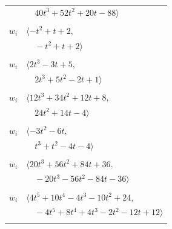 \documentclass[11pt]{article}
\begin{document}
\begin{longtable}{@{}ll@{}}
 & $\quad 40t^{3}+52t^{2}+20t-88\rangle$\\
\addlinespace[2pt]
\multicolumn{2}{@{}p{0.97\textwidth}@{}}{$i=26$, $D_i=1$, $\rho_{ij}$: $5{:}1, \allowbreak 10{:}2, \allowbreak 31{:}1$}\\
$w_i$ & $\langle -t^{2}+t+2,$\\
 & $\quad -t^{2}+t+2\rangle$\\
\addlinespace[2pt]
\multicolumn{2}{@{}p{0.97\textwidth}@{}}{$i=27$, $D_i=1$, $\rho_{ij}$: $1{:}2, \allowbreak 9{:}2, \allowbreak 10{:}1, \allowbreak 13{:}2, \allowbreak 34{:}2, \allowbreak 36{:}1$}\\
$w_i$ & $\langle 2t^{3}-3t+5,$\\
 & $\quad 2t^{3}+5t^{2}-2t+1\rangle$\\
\addlinespace[2pt]
\multicolumn{2}{@{}p{0.97\textwidth}@{}}{$i=28$, $D_i=1$, $\rho_{ij}$: $1{:}1, \allowbreak 4{:}1, \allowbreak 5{:}2, \allowbreak 8{:}1, \allowbreak 19{:}2, \allowbreak 23{:}1, \allowbreak 29{:}2, \allowbreak 34{:}2$}\\
$w_i$ & $\langle 12t^{3}+34t^{2}+12t+8,$\\
 & $\quad 24t^{2}+14t-4\rangle$\\
\addlinespace[2pt]
\multicolumn{2}{@{}p{0.97\textwidth}@{}}{$i=29$, $D_i=1$, $\rho_{ij}$: $1{:}2, \allowbreak 10{:}2, \allowbreak 13{:}1, \allowbreak 18{:}1, \allowbreak 28{:}1, \allowbreak 33{:}1$}\\
$w_i$ & $\langle -3t^{2}-6t,$\\
 & $\quad t^{3}+t^{2}-4t-4\rangle$\\
\addlinespace[2pt]
\multicolumn{2}{@{}p{0.97\textwidth}@{}}{$i=30$, $D_i=1$, $\rho_{ij}$: $4{:}2, \allowbreak 11{:}1, \allowbreak 14{:}1, \allowbreak 16{:}2, \allowbreak 17{:}2, \allowbreak 19{:}1, \allowbreak 21{:}1, \allowbreak 32{:}2$}\\
$w_i$ & $\langle 20t^{3}+56t^{2}+84t+36,$\\
 & $\quad -20t^{3}-56t^{2}-84t-36\rangle$\\
\addlinespace[2pt]
\multicolumn{2}{@{}p{0.97\textwidth}@{}}{$i=31$, $D_i=1$, $\rho_{ij}$: $7{:}1, \allowbreak 10{:}2, \allowbreak 16{:}2, \allowbreak 18{:}2, \allowbreak 20{:}2, \allowbreak 26{:}2, \allowbreak 34{:}1$}\\
$w_i$ & $\langle 4t^{5}+10t^{4}-4t^{3}-10t^{2}+24,$\\
 & $\quad -4t^{5}+8t^{4}+4t^{3}-2t^{2}-12t+12\rangle$\\
\addlinespace[2pt]
\multicolumn{2}{@{}p{0.97\textwidth}@{}}{$i=32$, $D_i=81$, $\rho_{ij}$: $2{:}1, \allowbreak 3{:}2, \allowbreak 6{:}2, \allowbreak 7{:}1, \allowbreak 8{:}1, \allowbreak 12{:}2, \allowbreak 19{:}2, \allowbreak 23{:}1, \allowbreak 25{:}2, \allowbreak 30{:}1, \allowbreak 36{:}1$}\\

\end{longtable}
\end{document}
